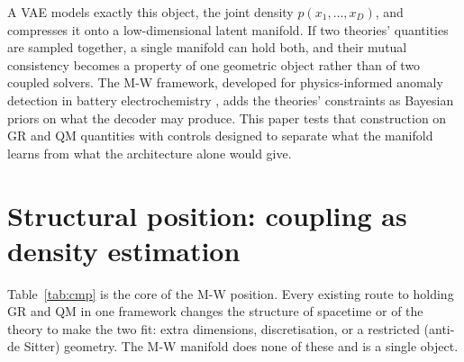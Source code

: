 \documentclass[10pt,twocolumn]{article}
\begin{document}
A VAE models exactly this object, the joint density $p(x_1,\dots,x_D)$, and compresses it onto a
low-dimensional latent manifold. If two theories' quantities are sampled together, a single
manifold can hold both, and their mutual consistency becomes a property of one geometric object
rather than of two coupled solvers. The M-W framework, developed for physics-informed anomaly
detection in battery electrochemistry \cite{mw2025}, adds the theories' constraints as Bayesian
priors on what the decoder may produce. This paper tests that construction on GR and QM
quantities with controls designed to separate what the manifold learns from what the
architecture alone would give.

\section{Structural position: coupling as density estimation}
\label{sec:struct}
Table~\ref{tab:cmp} is the core of the M-W position. Every existing route to holding GR and QM in
one framework changes the structure of spacetime or of the theory to make the two fit: extra
dimensions, discretisation, or a restricted (anti-de Sitter) geometry. The M-W manifold does none
of these and is a single object.

\begin{table}[t]
\centering\small
\setlength{\tabcolsep}{3.5pt}
\caption{Structural requirements by approach. The other entries are full theories of quantum
gravity; the M-W entry is a single learned object representing joint GR and QM content
(Results 1--3), compared here on structure.}
\label{tab:cmp}
\end{table}
\end{document}
